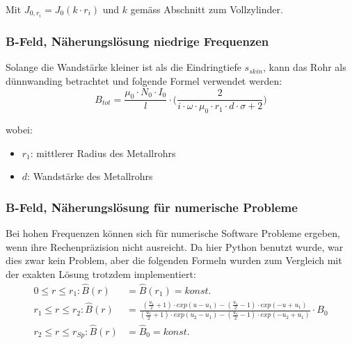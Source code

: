 Mit $J_{0,r_i} = J_0 (k \cdot r_i)$ und $k$ gem\"ass Abschnitt zum Vollzylinder.

\subsubsection{B-Feld, N\"aherungsl\"osung niedrige Frequenzen}
\label{sec:arbgru:subsec:hohlzylinder:BApprox}

Solange die  Wandst\"arke kleiner ist  als die Eindringtiefe  $s_{skin}$, kann
das Rohr als d\"unnwanding betrachtet und folgende Formel verwendet werden:
\begin{equation}
    \label{eq:hohlzylinder:BApprox}
    B_{tot} = \frac{\mu_0 \cdot N_0 \cdot I_0}{l} \cdot \Biggl( \frac{2}{i \cdot \omega \cdot \mu_0 \cdot r_1 \cdot d \cdot \sigma + 2} \Biggr)
\end{equation}


wobei:

\begin{itemize}
    \item[]
        $r_1$: mittlerer Radius des Metallrohrs
    \item[]
        $d$: Wandst\"arke des Metallrohrs
\end{itemize}

\subsubsection{B-Feld, N\"aherungsl\"osung f\"ur numerische Probleme}
\label{sec:arbgru:subsec:hohlzylinder:BApprox2}

Bei hohen Frequenzen k\"onnen sich f\"ur numerische Software Probleme ergeben,
wenn ihre Rechenpr\"azision nicht ausreicht. Da hier Python benutzt wurde, war
dies zwar  kein Problem, aber die  folgenden Formeln wurden zum  Vergleich mit
der exakten L\"osung trotzdem implementiert:
\vspace{-0.5em}
\begin{align}
    \label{eq:hohlzylinder:BExact}
    0 \leq r \leq r_1:      \hat{B} (r) & = \hat{B} (r_1) = konst. \\
    r_1 \leq r \leq r_2:    \hat{B} (r) & = \frac{(\frac{u_1}{2} + 1 ) \cdot exp(u - u_1) - (\frac{u_1}{2} - 1 ) \cdot exp(-u+u_1)}{(\frac{u_1}{2} + 1 ) \cdot exp(u_2 - u_1) - (\frac{u_1}{2} - 1 ) \cdot exp(-u_2+u_1)} \cdot B_0  \\
    r_2 \leq r \leq r_{Sp}: \hat{B} (r) & = \hat{B}_0 = konst.
\end{align}

